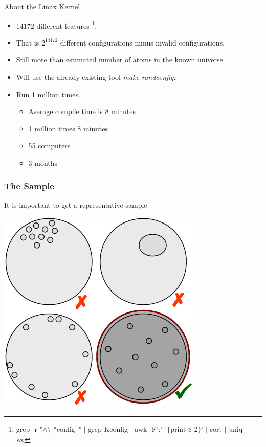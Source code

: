 \documentclass[mathserif,serif]{beamer}
\newenvironment{items}{
\begin{itemize}
  \setlength{\itemsep}{0pt}
  \setlength{\parskip}{7pt}
  \setlength{\parsep}{4pt}
}{\end{itemize}}
\begin{document}
\begin{frame}[t]{About the Linux Kernel}
    

    \begin{items}
        \item 14172 different features \footnote{ grep -r "$\wedge\setminus$ *config\ " $|$ grep Kconfig $|$ awk -F':' '$\{$print \$ 2$\}$' $|$ sort $|$ uniq $|$ wc }.
        \item That is $2^{14172}$ different configurations minus invalid 
                configurations.
        \item Still more than estimated number of atoms in the known universe.
        \item Will use the already existing tool \emph{make randconfig}.
        \item Run 1 million times.
        \begin{items}
            \item Average compile time is 8 minutes
            \item 1 million times 8 minutes
            \item 55 computers
            \item 3 months
        \end{items}
    \end{items}
\end{frame}

\begin{frame}[t]
    
    \frametitle{The Sample}
    

    It is important to get a representative sample

    \includegraphics[scale=.5]{sample.png}
\end{frame}
\end{document}
